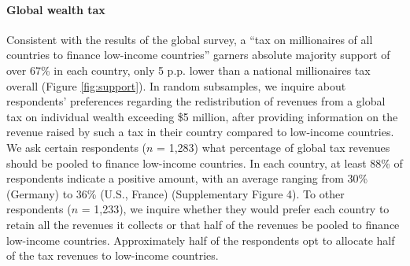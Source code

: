 


\paragraph{Global wealth tax}\label{subsubsec:support_global_wealth_tax} %

Consistent with the results of the global survey, a ``tax on millionaires of all countries to finance low-income countries'' garners absolute majority support of over 67\% in each country, only 5 p.p. lower than a national millionaires tax overall (Figure \ref{fig:support}). In random subsamples, we inquire about respondents' preferences regarding the redistribution of revenues from a global tax on individual wealth exceeding \$5 million, after providing information on the revenue raised by such a tax in their country compared to low-income countries. %
We ask certain respondents ($n$ = 1,283) what percentage of global tax revenues should be pooled to finance low-income countries. In each country, at least 88\% of respondents indicate a positive amount, with an average ranging from 30\% (Germany) to 36\% (U.S., France) (Supplementary Figure 4). To other respondents ($n$ = 1,233), we inquire whether they would prefer each country to retain all the revenues it collects or that half of the revenues be pooled to finance low-income countries. Approximately half of the respondents opt to allocate half of the tax revenues to low-income countries.


